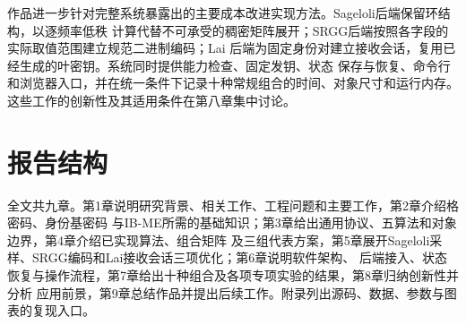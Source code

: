 作品进一步针对完整系统暴露出的主要成本改进实现方法。Sageloli后端保留环结构，以逐频率低秩
计算代替不可承受的稠密矩阵展开；SRGG后端按照各字段的实际取值范围建立规范二进制编码；Lai
后端为固定身份对建立接收会话，复用已经生成的叶密钥。系统同时提供能力检查、固定发钥、状态
保存与恢复、命令行和浏览器入口，并在统一条件下记录十种常规组合的时间、对象尺寸和运行内存。
这些工作的创新性及其适用条件在第八章集中讨论。

\section{报告结构}

全文共九章。第1章说明研究背景、相关工作、工程问题和主要工作，第2章介绍格密码、身份基密码
与IB-ME所需的基础知识；第3章给出通用协议、五算法和对象边界，第4章介绍已实现算法、组合矩阵
及三组代表方案，第5章展开Sageloli采样、SRGG编码和Lai接收会话三项优化；第6章说明软件架构、
后端接入、状态恢复与操作流程，第7章给出十种组合及各项专项实验的结果，第8章归纳创新性并分析
应用前景，第9章总结作品并提出后续工作。附录列出源码、数据、参数与图表的复现入口。
